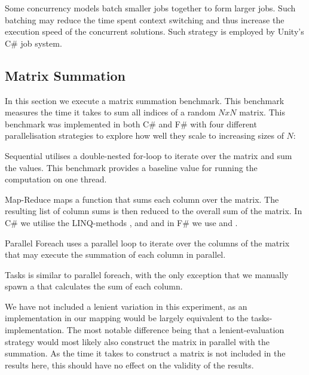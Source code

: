 Some concurrency models batch smaller jobs together to form larger jobs. Such batching may reduce the time spent context switching and thus increase the execution speed of the concurrent solutions. Such strategy is employed by Unity's C\# job system\cite{unity:csharp:job:system}.

\subsection{Matrix Summation}
In this section we execute a matrix summation benchmark. This benchmark measures the time it takes to sum all indices of a random $N x N$ matrix. This benchmark was implemented in both C\# and F\# with four different parallelisation strategies to explore how well they scale to increasing sizes of $N$:

\begin{labeling}{\quad\quad}
    \item[Sequential] utilises a double-nested for-loop to iterate over the matrix and sum the values. This benchmark provides a baseline value for running the computation on one thread.
    \item[Map-Reduce] maps a function that sums each column over the matrix. The resulting list of column sums is then reduced to the overall sum of the matrix. In C\# we utilise the \gls{LINQ}-methods ,  and  and in F\# we use  and .
    \item[Parallel Foreach] uses a parallel loop to iterate over the columns of the matrix that may execute the summation of each column in parallel.
    \item[Tasks] is similar to parallel foreach, with the only exception that we manually spawn a  that calculates the sum of each column.
\end{labeling}

We have not included a lenient variation in this experiment, as an implementation in our mapping would be largely equivalent to the tasks-implementation. The most notable difference being that a lenient-evaluation strategy would most likely also construct the matrix in parallel with the summation. As the time it takes to construct a matrix is not included in the results here, this should have no effect on the validity of the results.

